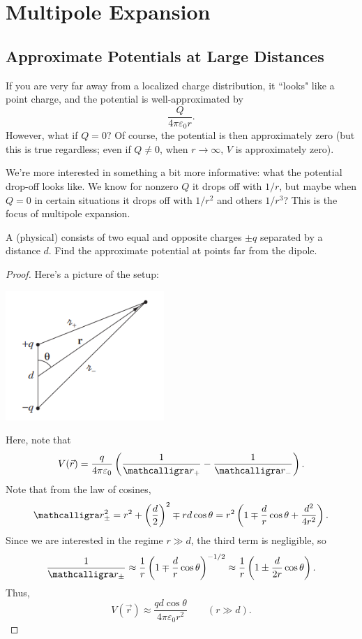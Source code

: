 \section{Multipole Expansion}

\subsection{Approximate Potentials at Large Distances}

If you are very far away from a localized charge distribution, it ``looks" like a point charge, and the potential is well-approximated by 
\[\frac{Q}{4\pi\varepsilon_0r}.\]
However, what if $Q=0$? Of course, the potential is then approximately zero (but this is true regardless; even if $Q\neq 0$, when $r\to \infty$, $V$ is approximately zero). 

We're more interested in something a bit more informative: what the potential drop-off looks like. We know for nonzero $Q$ it drops off with $1/r$, but maybe when $Q=0$ in certain situations it drops off with $1/r^2$ and others $1/r^3$? This is the focus of multipole expansion.

\begin{example}\label{physelecdip}
A (physical)  consists of two equal and opposite charges $\pm q$ separated by a distance $d$. Find the approximate potential at points far from the dipole.
\end{example}

\begin{proof}
Here's a picture of the setup:
\begin{center}
    \includegraphics[width=6cm]{Electrodynamics/images/fig3.26.PNG}
\end{center}
Here, note that
\[V(\vec{r})=\frac{q}{4\pi\varepsilon_0}\left(\frac{1}{\scr_+}-\frac{1}{\scr_-}\right).\]
Note that from the law of cosines,
\[\scr_\pm^2=r^2+\left(\frac{d}{2}\right)^2\mp rd\cos\theta=r^2\left(1\mp \frac{d}{r}\cos\theta+\frac{d^2}{4r^2}\right).\]
Since we are interested in the regime $r\gg d$, the third term is negligible, so
\[\frac{1}{\scr_\pm}\approx \frac{1}{r}\left(1\mp \frac{d}{r}\cos\theta\right)^{-1/2}\approx \frac{1}{r}\left(1\pm\frac{d}{2r}\cos\theta\right).\]
Thus,
\[\boxed{V(\vec{r})\approx \frac{qd\cos\theta}{4\pi\varepsilon_0r^2}\qquad (r\gg d)}.\]
\end{proof}

